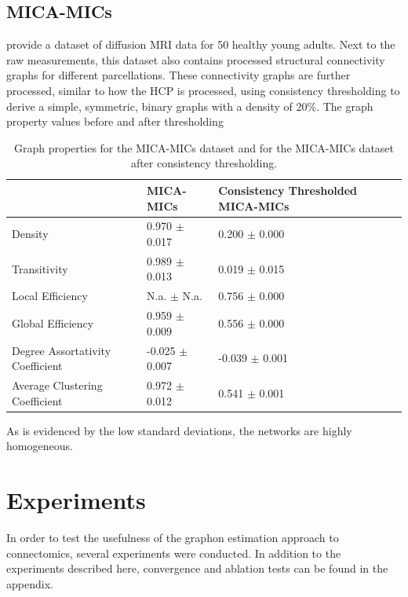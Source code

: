 \documentclass[11pt]{report} %
\begin{document}
\subsection{MICA-MICs}
 provide a dataset of diffusion MRI data for 50 healthy young adults. Next to the raw measurements, this dataset also contains processed structural connectivity graphs for different parcellations. These connectivity graphs are further processed, similar to how the HCP is processed, using consistency thresholding to derive a simple, symmetric, binary graphs with a density of 20\%. The graph property values before and after thresholding
\begin{table}[h]
\caption{Graph properties for the MICA-MICs dataset and for the MICA-MICs dataset after consistency thresholding.}
\begin{tabular}{|l|l|l|l|}
\hline
 & \textbf{MICA-MICs} & \textbf{Consistency Thresholded MICA-MICs}  \\ \hline
Density           & 0.970 $\pm$ 0.017  & 0.200 $\pm$ 0.000 \\ \hline
Transitivity      & 0.989 $\pm$ 0.013  & 0.019 $\pm$ 0.015 \\ \hline
Local Efficiency  &  N.a. $\pm$ N.a.   & 0.756 $\pm$ 0.000 \\ \hline
Global Efficiency & 0.959 $\pm$ 0.009  & 0.556 $\pm$ 0.000\\ \hline
Degree Assortativity Coefficient  & -0.025 $\pm$ 0.007 & -0.039 $\pm$ 0.001 \\ \hline
Average Clustering Coefficient    & 0.972 $\pm$ 0.012  &  0.541 $\pm$ 0.001 \\ \hline
\end{tabular}
\end{table}
As is evidenced by the low standard deviations, the networks are highly homogeneous.
\section{Experiments}
In order to test the usefulness of the graphon estimation approach to connectomics, several experiments were conducted. In addition to the experiments described here, convergence and ablation tests can be found in the appendix.
\end{document}

